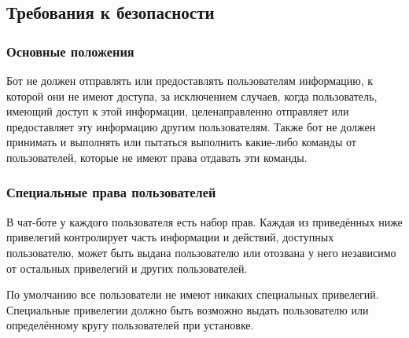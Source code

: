 \subsection{Требования к безопасности}
\label{sec:req:sec}
\subsubsection{Основные положения}
    \label{sec:req:sec:common}
    Бот не должен отправлять или предоставлять пользователям информацию,
    к которой они не имеют доступа, за исключением случаев,
    когда пользователь, имеющий доступ к этой информации, целенаправленно
    отправляет или предоставляет эту информацию другим пользователям.
    Также бот не должен принимать и выполнять или пытаться выполнить какие-либо команды от
    пользователей, которые не имеют права отдавать эти команды.

\subsubsection{Специальные права пользователей}
    \label{sec:req:sec:privs}
    В чат-боте у каждого пользователя есть набор прав. Каждая из приведённых ниже привелегий
    контролирует часть информации и действий, доступных пользователю,
    может быть выдана пользователю или отозвана у него независимо от остальных привелегий
    и других пользователей.

    По умолчанию все пользователи не имеют никаких специальных привелегий. Специальные привелегии
    должно быть возможно выдать пользователю или определённому кругу пользователей при установке.

